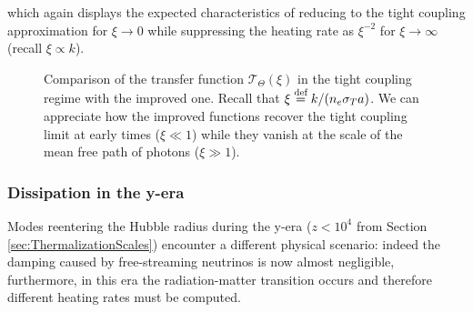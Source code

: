 which again displays the expected characteristics of reducing to the tight coupling approximation for $\xi\to0$ while suppressing the heating rate as $\xi^{-2}$ for $\xi\to\infty$ (recall $\xi\propto k$).
\begin{figure}
\centering
{}
\caption{Comparison of the transfer function $\mathcal{T}_\Theta(\xi)$ in the tight coupling regime with the improved one. Recall that $\xi \stackrel{\text{def}}{=} k/(n_e\sigma_T a)$. We can appreciate how the improved functions recover the tight coupling limit at early times ($\xi\ll1$) while they vanish at the scale of the mean free path of photons ($\xi\gg1$).}
\label{fig:fight_coupling}
\end{figure}
\subsubsection{Dissipation in the y-era}
Modes reentering the Hubble radius during the y-era ($z<10^4$ from Section \ref{sec:ThermalizationScales}) encounter a different physical scenario: indeed the damping caused by free-streaming neutrinos is now almost negligible, furthermore, in this era the radiation-matter transition occurs and therefore different heating rates must be computed. 

